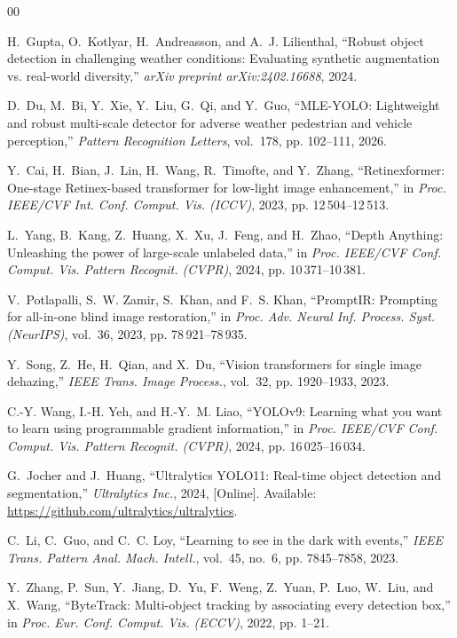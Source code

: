 \documentclass[conference]{IEEEtran}
\begin{document}
\begin{thebibliography}{00}

H.~Gupta, O.~Kotlyar, H.~Andreasson, and A.~J. Lilienthal,
``Robust object detection in challenging weather conditions: Evaluating synthetic augmentation vs. real-world diversity,''
\emph{arXiv preprint arXiv:2402.16688}, 2024.

D.~Du, M.~Bi, Y.~Xie, Y.~Liu, G.~Qi, and Y.~Guo,
``MLE-YOLO: Lightweight and robust multi-scale detector for adverse weather pedestrian and vehicle perception,''
\emph{Pattern Recognition Letters}, vol.~178, pp. 102--111, 2026.

Y.~Cai, H.~Bian, J.~Lin, H.~Wang, R.~Timofte, and Y.~Zhang,
``Retinexformer: One-stage Retinex-based transformer for low-light image enhancement,''
in \emph{Proc. IEEE/CVF Int. Conf. Comput. Vis. (ICCV)}, 2023, pp. 12\,504--12\,513.

L.~Yang, B.~Kang, Z.~Huang, X.~Xu, J.~Feng, and H.~Zhao,
``Depth Anything: Unleashing the power of large-scale unlabeled data,''
in \emph{Proc. IEEE/CVF Conf. Comput. Vis. Pattern Recognit. (CVPR)}, 2024, pp. 10\,371--10\,381.

V.~Potlapalli, S.~W. Zamir, S.~Khan, and F.~S. Khan,
``PromptIR: Prompting for all-in-one blind image restoration,''
in \emph{Proc. Adv. Neural Inf. Process. Syst. (NeurIPS)}, vol.~36, 2023, pp. 78\,921--78\,935.

Y.~Song, Z.~He, H.~Qian, and X.~Du,
``Vision transformers for single image dehazing,''
\emph{IEEE Trans. Image Process.}, vol.~32, pp. 1920--1933, 2023.

C.-Y. Wang, I.-H. Yeh, and H.-Y.~M. Liao,
``YOLOv9: Learning what you want to learn using programmable gradient information,''
in \emph{Proc. IEEE/CVF Conf. Comput. Vis. Pattern Recognit. (CVPR)}, 2024, pp. 16\,025--16\,034.

G.~Jocher and J.~Huang,
``Ultralytics YOLO11: Real-time object detection and segmentation,''
\emph{Ultralytics Inc.}, 2024, [Online]. Available: \url{https://github.com/ultralytics/ultralytics}.

C.~Li, C.~Guo, and C.~C. Loy,
``Learning to see in the dark with events,''
\emph{IEEE Trans. Pattern Anal. Mach. Intell.}, vol.~45, no.~6, pp. 7845--7858, 2023.

Y.~Zhang, P.~Sun, Y.~Jiang, D.~Yu, F.~Weng, Z.~Yuan, P.~Luo, W.~Liu, and X.~Wang,
``ByteTrack: Multi-object tracking by associating every detection box,''
in \emph{Proc. Eur. Conf. Comput. Vis. (ECCV)}, 2022, pp. 1--21.


\end{thebibliography}
\end{document}
